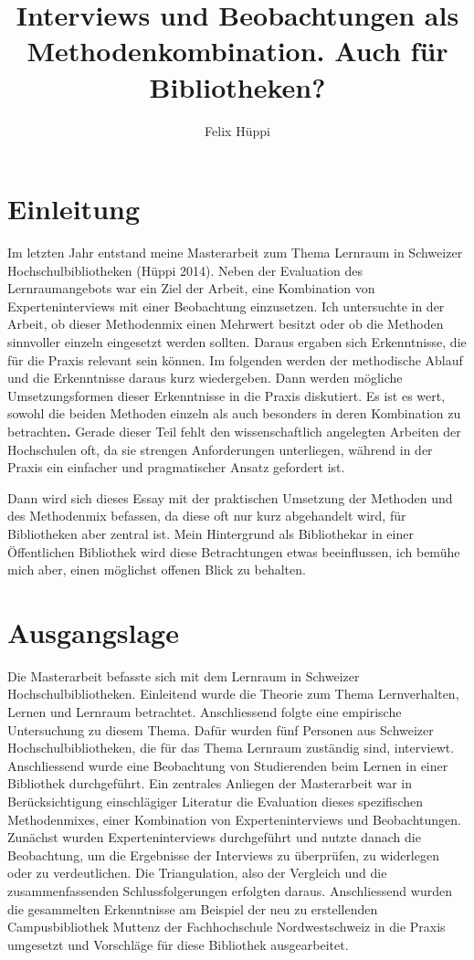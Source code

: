 \documentclass[a4paper,
fontsize=11pt,
oneside,
numbers=noperiodatend,
parskip=half-,
bibliography=totoc,
final
]{scrartcl}
\title{\LARGE{Interviews und Beobachtungen als Methodenkombination. Auch für
Bibliotheken?}} %
\author{Felix Hüppi} %
\date{}
\begin{document}
\maketitle
\thispagestyle{fancyplain} 


\section*{Einleitung}\label{einleitung}

Im letzten Jahr entstand meine Masterarbeit zum Thema Lernraum in
Schweizer Hochschulbibliotheken (Hüppi 2014). Neben der Evaluation des
Lernraumangebots war ein Ziel der Arbeit, eine Kombination von
Experteninterviews mit einer Beobachtung einzusetzen. Ich untersuchte in
der Arbeit, ob dieser Methodenmix einen Mehrwert besitzt oder ob die
Methoden sinnvoller einzeln eingesetzt werden sollten. Daraus ergaben
sich Erkenntnisse, die für die Praxis relevant sein können. Im folgenden
werden der methodische Ablauf und die Erkenntnisse daraus kurz
wiedergeben. Dann werden mögliche Umsetzungsformen dieser Erkenntnisse
in die Praxis diskutiert. Es ist es wert, sowohl die beiden Methoden
einzeln als auch besonders in deren Kombination zu betrachten\textbf{.}
Gerade dieser Teil fehlt den wissenschaftlich angelegten Arbeiten der
Hochschulen oft, da sie strengen Anforderungen unterliegen, während in
der Praxis ein einfacher und pragmatischer Ansatz gefordert ist.

Dann wird sich dieses Essay mit der praktischen Umsetzung der Methoden
und des Methodenmix befassen, da diese oft nur kurz abgehandelt wird,
für Bibliotheken aber zentral ist. Mein Hintergrund als Bibliothekar in
einer Öffentlichen Bibliothek wird diese Betrachtungen etwas
beeinflussen, ich bemühe mich aber, einen möglichst offenen Blick zu
behalten.

\section*{Ausgangslage}\label{ausgangslage}

Die Masterarbeit befasste sich mit dem Lernraum in Schweizer
Hochschulbibliotheken. Einleitend wurde die Theorie zum Thema
Lernverhalten, Lernen und Lernraum betrachtet. Anschliessend folgte eine
empirische Untersuchung zu diesem Thema. Dafür wurden fünf Personen aus
Schweizer Hochschulbibliotheken, die für das Thema Lernraum zuständig
sind, interviewt. Anschliessend wurde eine Beobachtung von Studierenden
beim Lernen in einer Bibliothek durchgeführt. Ein zentrales Anliegen der
Masterarbeit war in Berücksichtigung einschlägiger Literatur die
Evaluation dieses spezifischen Methodenmixes, einer Kombination von
Experteninterviews und Beobachtungen. Zunächst wurden Experteninterviews
durchgeführt und nutzte danach die Beobachtung, um die Ergebnisse der
Interviews zu überprüfen, zu widerlegen oder zu verdeutlichen. Die
Triangulation, also der Vergleich und die zusammenfassenden
Schlussfolgerungen erfolgten daraus. Anschliessend wurden die
gesammelten Erkenntnisse am Beispiel der neu zu erstellenden
Campusbibliothek
Muttenz der
Fachhochschule Nordwestschweiz in die Praxis umgesetzt und Vorschläge
für diese Bibliothek ausgearbeitet.
\end{document}
